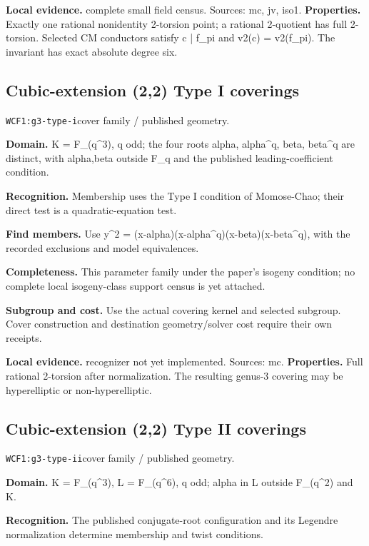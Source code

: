 \documentclass[10pt]{article}
\begin{document}
\textbf{Local evidence.} complete small field census. Sources: mc, jv, iso1.
\textbf{Properties.} Exactly one rational nonidentity 2-torsion point; a rational 2-quotient has full 2-torsion. Selected CM conductors satisfy c | f\_pi and v2(c) = v2(f\_pi). The invariant has exact absolute degree six.\par
{}\subsection{Cubic-extension (2,2) Type I coverings}
\texttt{WCF1:g3-type-i}\quad cover family / published geometry.\par
\textbf{Domain.} K = F\_(q\textasciicircum{}3), q odd; the four roots alpha, alpha\textasciicircum{}q, beta, beta\textasciicircum{}q are distinct, with alpha,beta outside F\_q and the published leading-coefficient condition.\par
\textbf{Recognition.} Membership uses the Type I condition of Momose-Chao; their direct test is a quadratic-equation test.\par
\textbf{Find members.} Use y\textasciicircum{}2 = (x-alpha)(x-alpha\textasciicircum{}q)(x-beta)(x-beta\textasciicircum{}q), with the recorded exclusions and model equivalences.\par
\textbf{Completeness.} This parameter family under the paper's isogeny condition; no complete local isogeny-class support census is yet attached.\par
\textbf{Subgroup and cost.} Use the actual covering kernel and selected subgroup. Cover construction and destination geometry/solver cost require their own receipts.\par
\textbf{Local evidence.} recognizer not yet implemented. Sources: mc.
\textbf{Properties.} Full rational 2-torsion after normalization. The resulting genus-3 covering may be hyperelliptic or non-hyperelliptic.\par
{}\subsection{Cubic-extension (2,2) Type II coverings}
\texttt{WCF1:g3-type-ii}\quad cover family / published geometry.\par
\textbf{Domain.} K = F\_(q\textasciicircum{}3), L = F\_(q\textasciicircum{}6), q odd; alpha in L outside F\_(q\textasciicircum{}2) and K.\par
\textbf{Recognition.} The published conjugate-root configuration and its Legendre normalization determine membership and twist conditions.\par
\end{document}
